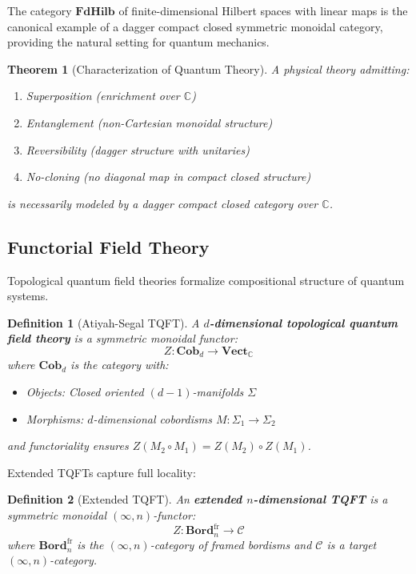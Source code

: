 \documentclass[11pt,a4paper]{article}
\newtheorem{theorem}{Theorem}[section]
\newtheorem{definition}{Definition}[section]
\theoremstyle{remark}
\theoremstyle{definition}
\begin{document}
The category $\textbf{FdHilb}$ of finite-dimensional Hilbert spaces with linear maps is the canonical example of a dagger compact closed symmetric monoidal category, providing the natural setting for quantum mechanics.

\begin{theorem}[Characterization of Quantum Theory]
\label{thm:quantum_categorical}
A physical theory admitting:
\begin{enumerate}[label=(\roman*)]
\item Superposition (enrichment over $\mathbb{C}$)
\item Entanglement (non-Cartesian monoidal structure)
\item Reversibility (dagger structure with unitaries)
\item No-cloning (no diagonal map in compact closed structure)
\end{enumerate}
is necessarily modeled by a dagger compact closed category over $\mathbb{C}$.
\end{theorem}

\subsection{Functorial Field Theory}

Topological quantum field theories formalize compositional structure of quantum systems.

\begin{definition}[Atiyah-Segal TQFT]
A \textbf{$d$-dimensional topological quantum field theory} is a symmetric monoidal functor:
\begin{equation}
Z: \textbf{Cob}_d \to \textbf{Vect}_{\mathbb{C}}
\end{equation}
where $\textbf{Cob}_d$ is the category with:
\begin{itemize}
\item Objects: Closed oriented $(d-1)$-manifolds $\Sigma$
\item Morphisms: $d$-dimensional cobordisms $M: \Sigma_1 \to \Sigma_2$
\end{itemize}
and functoriality ensures $Z(M_2 \circ M_1) = Z(M_2) \circ Z(M_1)$.
\end{definition}

Extended TQFTs capture full locality:

\begin{definition}[Extended TQFT]
An \textbf{extended $n$-dimensional TQFT} is a symmetric monoidal $(\infty, n)$-functor:
\begin{equation}
Z: \textbf{Bord}_n^{\text{fr}} \to \mathcal{C}
\end{equation}
where $\textbf{Bord}_n^{\text{fr}}$ is the $(\infty, n)$-category of framed bordisms and $\mathcal{C}$ is a target $(\infty, n)$-category.
\end{definition}
\end{document}
